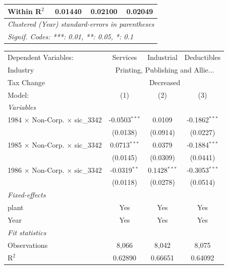 \documentclass[
  12pt]{article}
\theoremstyle{definition}
\theoremstyle{remark}
\begin{document}
\begin{table}
\begin{minipage}{\linewidth}
\begin{tabular}{lccc}
   Within R$^2$                                  & 0.01440        & 0.02100         & 0.02049\\  
   \midrule \midrule
   \multicolumn{4}{l}{\emph{Clustered (Year) standard-errors in parentheses}}\\
   \multicolumn{4}{l}{\emph{Signif. Codes: ***: 0.01, **: 0.05, *: 0.1}}\\
\end{tabular}
\par\endgroup
\begingroup
\centering
\begin{tabular}{lccc}
   \tabularnewline \midrule \midrule
   Dependent Variables:                          & Services        & Industrial     & Deductibles\\  
   Industry & \multicolumn{3}{c}{Printing, Publishing and Allie...} \\ 
   Tax Change & \multicolumn{3}{c}{Decreased} \\ 
   Model:                                        & (1)             & (2)            & (3)\\  
   \midrule
   \emph{Variables}\\
   1984 $\times$ Non-Corp. $\times$ sic\_3342    & -0.0503$^{***}$ & 0.0109         & -0.1862$^{***}$\\   
                                                 & (0.0138)        & (0.0914)       & (0.0227)\\   
   1985 $\times$ Non-Corp. $\times$ sic\_3342    & 0.0713$^{***}$  & 0.0379         & -0.1884$^{***}$\\   
                                                 & (0.0145)        & (0.0309)       & (0.0441)\\   
   1986 $\times$ Non-Corp. $\times$ sic\_3342    & -0.0319$^{**}$  & 0.1428$^{***}$ & -0.3053$^{***}$\\   
                                                 & (0.0118)        & (0.0278)       & (0.0514)\\   
   \midrule
   \emph{Fixed-effects}\\
   plant                                         & Yes             & Yes            & Yes\\  
   Year                                          & Yes             & Yes            & Yes\\  
   \midrule
   \emph{Fit statistics}\\
   Observations                                  & 8,066           & 8,042          & 8,075\\  
   R$^2$                                         & 0.62890         & 0.66651        & 0.64092\\  

\end{tabular}
\end{minipage}
\end{table}
\end{document}

